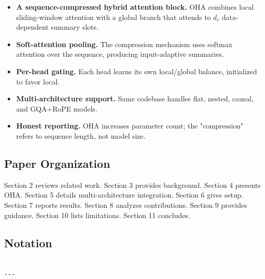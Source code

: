 \begin{itemize}
\item \textbf{A sequence-compressed hybrid attention block.} OHA combines local
  sliding-window attention with a global branch that attends to $d_c$
  data-dependent summary slots.
\item \textbf{Soft-attention pooling.} The compression mechanism uses softmax
  attention over the sequence, producing input-adaptive summaries.
\item \textbf{Per-head gating.} Each head learns its own local/global balance,
  initialized to favor local.
\item \textbf{Multi-architecture support.} Same codebase handles flat, nested,
  causal, and GQA+RoPE models.
\item \textbf{Honest reporting.} OHA increases parameter count; the "compression"
  refers to sequence length, not model size.

\end{itemize}
\subsection{Paper Organization}

Section 2 reviews related work. Section 3 provides background. Section 4 
presents OHA. Section 5 details multi-architecture integration. Section 6 
gives setup. Section 7 reports results. Section 8 analyzes contributions. 
Section 9 provides guidance. Section 10 lists limitations. Section 11 
concludes.



\subsection{Notation}

\begin{lstlisting}

---
\end{lstlisting}